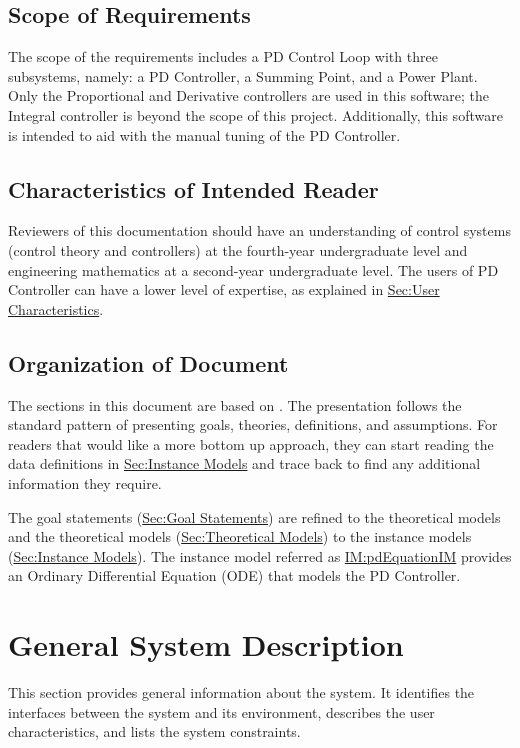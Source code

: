 \documentclass[12pt]{article}
\begin{document}
\subsection{Scope of Requirements}
\label{Sec:ReqsScope}
The scope of the requirements includes a PD Control Loop with three subsystems, namely: a PD Controller, a Summing Point, and a Power Plant. Only the Proportional and Derivative controllers are used in this software; the Integral controller is beyond the scope of this project. Additionally, this software is intended to aid with the manual tuning of the PD Controller.

\subsection{Characteristics of Intended Reader}
\label{Sec:ReaderChars}
Reviewers of this documentation should have an understanding of control systems (control theory and controllers) at the fourth-year undergraduate level and engineering mathematics at a second-year undergraduate level. The users of PD Controller can have a lower level of expertise, as explained in \hyperref[Sec:UserChars]{Sec:User Characteristics}.

\subsection{Organization of Document}
\label{Sec:DocOrg}
The sections in this document are based on \cite{smithLai2005}. The presentation follows the standard pattern of presenting goals, theories, definitions, and assumptions. For readers that would like a more bottom up approach, they can start reading the data definitions in \hyperref[Sec:IMs]{Sec:Instance Models} and trace back to find any additional information they require.

The goal statements (\hyperref[Sec:GoalStmt]{Sec:Goal Statements}) are refined to the theoretical models and the theoretical models (\hyperref[Sec:TMs]{Sec:Theoretical Models}) to the instance models (\hyperref[Sec:IMs]{Sec:Instance Models}). The instance model referred as \hyperref[IM:pdEquationIM]{IM:pdEquationIM} provides an Ordinary Differential Equation (ODE) that models the PD Controller.

\section{General System Description}
\label{Sec:GenSysDesc}
This section provides general information about the system. It identifies the interfaces between the system and its environment, describes the user characteristics, and lists the system constraints.
\end{document}
